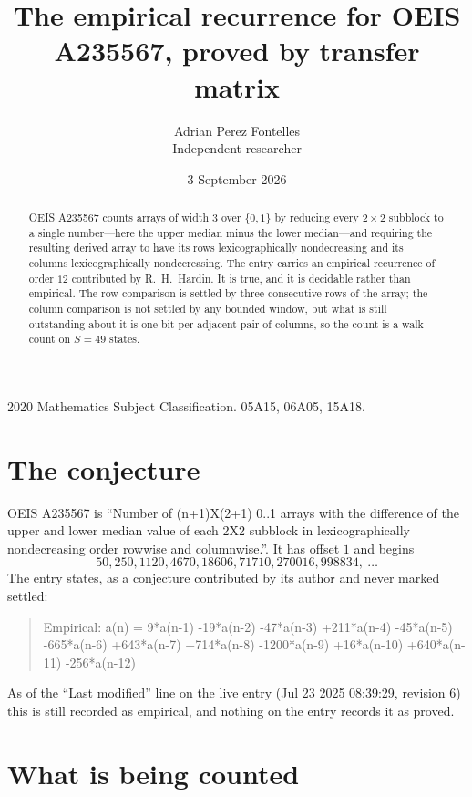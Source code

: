 \documentclass[11pt,a4paper]{article}
\title{The empirical recurrence for OEIS A235567, proved by transfer matrix}
\author{Adrian Perez Fontelles\\ \small Independent researcher}
\date{3 September 2026}
\theoremstyle{plain}
\theoremstyle{definition}
\begin{document}
\maketitle

\begin{abstract}
OEIS A235567 counts arrays of width $3$ over $\{0,1\}$ by reducing every $2\times2$ subblock to a
single number---here the upper median minus the lower median---and requiring the resulting derived array to have its rows
lexicographically nondecreasing and its columns lexicographically nondecreasing. The entry carries an
empirical recurrence of order $12$ contributed by R.~H.~Hardin. It is true, and it is
decidable rather than empirical. The row comparison is settled by three consecutive rows of the
array; the column comparison is not settled by any bounded window, but what is still outstanding
about it is one bit per adjacent pair of columns, so the count is a walk count on $S=49$
states.
\end{abstract}

\noindent\small 2020 Mathematics Subject Classification. 05A15, 06A05, 15A18.\normalsize

\section{The conjecture}

OEIS A235567 is ``Number of (n+1)X(2+1) 0..1 arrays with the difference of the upper and lower median value of each 2X2 subblock in lexicographically nondecreasing order rowwise and columnwise.''. It has offset $1$ and begins
\[
50, 250, 1120, 4670, 18606, 71710, 270016, 998834,\ \dots
\]
The entry states, as a conjecture contributed by its author and never marked settled:
\begin{quote}
Empirical: a(n) = 9*a(n-1) -19*a(n-2) -47*a(n-3) +211*a(n-4) -45*a(n-5) -665*a(n-6) +643*a(n-7) +714*a(n-8) -1200*a(n-9) +16*a(n-10) +640*a(n-11) -256*a(n-12)
\end{quote}
As of the ``Last modified'' line on the live entry (Jul 23 2025 08:39:29, revision 6) this is still
recorded as empirical, and nothing on the entry records it as proved.

\section{What is being counted}
\end{document}
